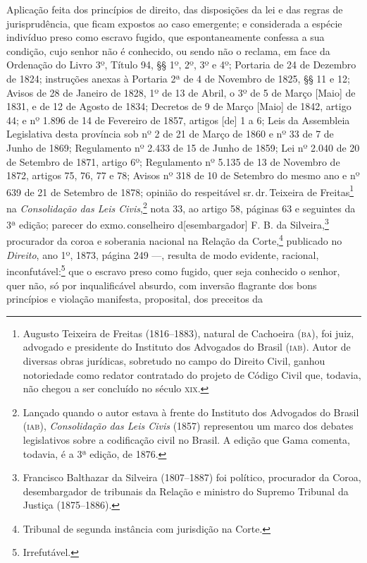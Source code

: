 Aplicação feita dos princípios de direito, das disposições da lei e das
regras de jurisprudência, que ficam expostos ao caso emergente; e
considerada a espécie indivíduo preso como escravo fugido, que
espontaneamente confessa a sua condição, cujo senhor não é conhecido, ou
sendo não o reclama, em face da Ordenação do Livro 3º, Título 94, §§ 1º,
2º, 3º e 4º; Portaria de 24 de Dezembro de 1824; instruções anexas à
Portaria 2ª de 4 de Novembro de 1825, §§ 11 e 12; Avisos de 28 de
Janeiro de 1828, 1º de 13 de Abril, o 3º de 5 de Março {[}Maio{]} de
1831, e de 12 de Agosto de 1834; Decretos de 9 de Março {[}Maio{]} de
1842, artigo 44; e nº 1.896 de 14 de Fevereiro de 1857, artigos {[}de{]}
1 a 6; Leis da Assembleia Legislativa desta província sob nº 2 de 21 de
Março de 1860 e nº 33 de 7 de Junho de 1869; Regulamento nº 2.433 de 15
de Junho de 1859; Lei nº 2.040 de 20 de Setembro de 1871, artigo 6º;
Regulamento nº 5.135 de 13 de Novembro de 1872, artigos 75, 76, 77 e 78;
Avisos nº 318 de 10 de Setembro do mesmo ano e nº 639 de 21 de Setembro
de 1878; opinião do respeitável sr.\,dr.\,Teixeira de Freitas\footnote{
  Augusto Teixeira de Freitas (1816--1883), natural de Cachoeira (\textsc{ba}),
  foi juiz, advogado e presidente do Instituto dos Advogados do Brasil
  (\textsc{iab}). Autor de diversas obras jurídicas, sobretudo no campo do
  Direito Civil, ganhou notoriedade como redator contratado do projeto
  de Código Civil que, todavia, não chegou a ser concluído no século \textsc{xix}.}
na \emph{Consolidação das Leis Civis},\footnote{Lançado quando o autor
  estava à frente do Instituto dos Advogados do Brasil (\textsc{iab}),
  \emph{Consolidação das Leis Civis} (1857) representou um marco dos
  debates legislativos sobre a codificação civil no Brasil. A edição que
  Gama comenta, todavia, é a 3ª edição, de 1876.} nota 33, ao artigo
58, páginas 63 e seguintes da 3ª edição; parecer do exmo.\,conselheiro
d{[}esembargador{]} F. B. da Silveira,\footnote{Francisco Balthazar
  da Silveira (1807--1887) foi político, procurador da Coroa,
  desembargador de tribunais da Relação e ministro do Supremo Tribunal
  da Justiça (1875--1886).} procurador da coroa e soberania nacional na
Relação da Corte,\footnote{Tribunal de segunda instância com jurisdição
  na Corte.} publicado no \emph{Direito}, ano 1º, 1873, página 249
---, resulta de modo evidente, racional, inconfutável:\footnote{
  Irrefutável.} que o escravo preso como fugido, quer seja conhecido o
senhor, quer não, só por inqualificável absurdo, com inversão flagrante
dos bons princípios e violação manifesta, proposital, dos preceitos da
